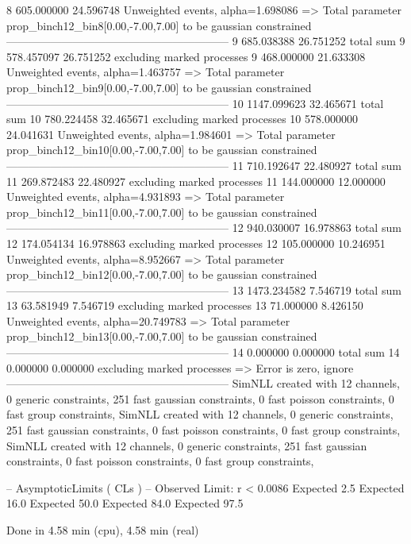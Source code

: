 8          605.000000      24.596748       Unweighted events, alpha=1.698086
  => Total parameter prop_binch12_bin8[0.00,-7.00,7.00] to be gaussian constrained
------------------------------------------------------------
9          685.038388      26.751252       total sum                     
9          578.457097      26.751252       excluding marked processes    
9          468.000000      21.633308       Unweighted events, alpha=1.463757
  => Total parameter prop_binch12_bin9[0.00,-7.00,7.00] to be gaussian constrained
------------------------------------------------------------
10         1147.099623     32.465671       total sum                     
10         780.224458      32.465671       excluding marked processes    
10         578.000000      24.041631       Unweighted events, alpha=1.984601
  => Total parameter prop_binch12_bin10[0.00,-7.00,7.00] to be gaussian constrained
------------------------------------------------------------
11         710.192647      22.480927       total sum                     
11         269.872483      22.480927       excluding marked processes    
11         144.000000      12.000000       Unweighted events, alpha=4.931893
  => Total parameter prop_binch12_bin11[0.00,-7.00,7.00] to be gaussian constrained
------------------------------------------------------------
12         940.030007      16.978863       total sum                     
12         174.054134      16.978863       excluding marked processes    
12         105.000000      10.246951       Unweighted events, alpha=8.952667
  => Total parameter prop_binch12_bin12[0.00,-7.00,7.00] to be gaussian constrained
------------------------------------------------------------
13         1473.234582     7.546719        total sum                     
13         63.581949       7.546719        excluding marked processes    
13         71.000000       8.426150        Unweighted events, alpha=20.749783
  => Total parameter prop_binch12_bin13[0.00,-7.00,7.00] to be gaussian constrained
------------------------------------------------------------
14         0.000000        0.000000        total sum                     
14         0.000000        0.000000        excluding marked processes    
  => Error is zero, ignore      
------------------------------------------------------------
SimNLL created with 12 channels, 0 generic constraints, 251 fast gaussian constraints, 0 fast poisson constraints, 0 fast group constraints, 
SimNLL created with 12 channels, 0 generic constraints, 251 fast gaussian constraints, 0 fast poisson constraints, 0 fast group constraints, 
SimNLL created with 12 channels, 0 generic constraints, 251 fast gaussian constraints, 0 fast poisson constraints, 0 fast group constraints, 

 -- AsymptoticLimits ( CLs ) --
Observed Limit: r < 0.0086
Expected  2.5%
Expected 16.0%
Expected 50.0%
Expected 84.0%
Expected 97.5%

Done in 4.58 min (cpu), 4.58 min (real)
